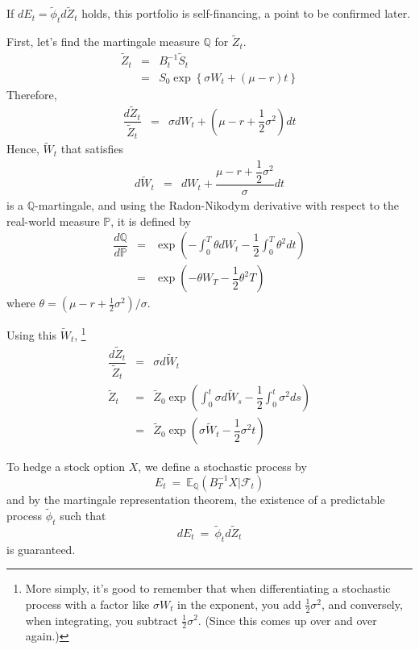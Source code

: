 \documentclass[uplatex,a4j,12pt,dvipdfmx]{jsarticle}
\begin{document}
If $dE_{t} = \tilde{\phi}_{t} d \tilde{Z}_{t}$ holds, this portfolio is self-financing, a point to be confirmed later.

First, let's find the martingale measure $\mathbb{Q}$ for $\tilde{Z}_{t}$.
%
%
\begin{eqnarray*}
	\tilde{Z}_{t}
	&=&
	B^{-1}_{t} \tilde{S}_{t}
	\\ &=&
	S_{0} \exp \left\{ \sigma W_{t} + ( \mu - r ) t \right\}
\end{eqnarray*}
%
%
Therefore,
%
%
\begin{eqnarray*}
	\dfrac{d \tilde{Z}_{t}}{\tilde{Z}_{t}}
	&=&
	\sigma dW_{t} + \left( \mu - r + \dfrac{1}{2} \sigma^{2} \right) dt
\end{eqnarray*}
%
%
Hence, $\tilde{W}_{t}$ that satisfies
%
%
\begin{eqnarray*}
	d \tilde{W}_{t}
	&=&
	dW_{t}
	+
	\dfrac{\mu - r + \dfrac{1}{2} \sigma^{2} }{\sigma} dt
\end{eqnarray*}
%
%
is a $\mathbb{Q}$-martingale, and using the Radon-Nikodym derivative with respect to the real-world measure $\mathbb{P}$, it is defined by
%
%
\begin{eqnarray*}
	\dfrac{d \mathbb{Q} }{ d \mathbb{P} }
	&=&
	\exp \left(
	-
	\int^{T}_{0} \theta dW_{t}
	-
	\dfrac{1}{2}
	\int^{T}_{0} \theta^{2} dt
	\right)
	\\ &=&
	\exp \left(
	-
	\theta W_{T}
	-
	\dfrac{1}{2}
	\theta^{2} T
	\right)
\end{eqnarray*}
%
%
where $\theta = (\mu - r + \frac{1}{2}\sigma^2)/\sigma$.

Using this $\tilde{W}_{t}$,
%
\footnote{More simply, it's good to remember that when differentiating a stochastic process with a factor like $\sigma W_{t}$ in the exponent, you add $\frac{1}{2}\sigma^2$, and conversely, when integrating, you subtract $\frac{1}{2}\sigma^2$. (Since this comes up over and over again.)}
%
%
\begin{eqnarray*}
	\dfrac{d \tilde{Z}_{t}}{\tilde{Z}_{t}}
	&=&
	\sigma d \tilde{W}_{t}
	\\
	\tilde{Z}_{t}
	&=&
	\tilde{Z}_{0}
	\exp \left(
	\int^{t}_{0} \sigma d\tilde{W}_{s}
	-
	\dfrac{1}{2}
	\int^{t}_{0} \sigma^{2} ds
	\right)
	\\ &=&
	\tilde{Z}_{0}
	\exp \left(
	\sigma \tilde{W}_{t}
	-
	\dfrac{1}{2}
	\sigma^{2} t
	\right)
\end{eqnarray*}
%
%

To hedge a stock option $X$, we define a stochastic process by
$$
	E_{t}
	\ = \
	\mathbb{E}_{\mathbb{Q}}(B^{-1}_{T} X | \mathcal{F}_{t} )
$$
and by the martingale representation theorem, the existence of a predictable process $\tilde{\phi}_{t}$ such that
$$
	dE_{t}
	\ = \
	\tilde{\phi}_{t}
	d \tilde{Z}_{t}
$$
is guaranteed.
\end{document}
